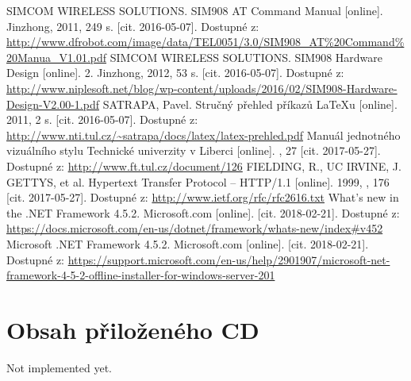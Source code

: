 \documentclass[FM,DP]{tulthesis}  %
\begin{document}
\begin{thebibliography}{10}
SIMCOM WIRELESS SOLUTIONS. SIM908 AT Command Manual [online]. Jinzhong, 2011, 249 s. [cit. 2016-05-07]. Dostupné z: \url{http://www.dfrobot.com/image/data/TEL0051/3.0/SIM908\_AT\%20Command\%20Manua\_V1.01.pdf}
SIMCOM WIRELESS SOLUTIONS. SIM908 Hardware Design [online]. 2. Jinzhong, 2012, 53 s. [cit. 2016-05-07]. Dostupné z: \url{http://www.niplesoft.net/blog/wp-content/uploads/2016/02/SIM908-Hardware-Design-V2.00-1.pdf}
SATRAPA, Pavel. Stručný přehled příkazů LaTeXu [online]. 2011, 2 s. [cit. 2016-05-07]. Dostupné z: \url{http://www.nti.tul.cz/~satrapa/docs/latex/latex-prehled.pdf}
Manuál jednotného vizuálního stylu Technické univerzity v Liberci [online]. , 27 [cit. 2017-05-27]. Dostupné z: \url{http://www.ft.tul.cz/document/126}
FIELDING, R., UC IRVINE, J. GETTYS, et al. Hypertext Transfer Protocol -- HTTP/1.1 [online]. 1999, , 176 [cit. 2017-05-27]. Dostupné z: \url{http://www.ietf.org/rfc/rfc2616.txt}
What's new in the .NET Framework 4.5.2. Microsoft.com [online]. [cit. 2018-02-21]. Dostupné z: \url{https://docs.microsoft.com/en-us/dotnet/framework/whats-new/index#v452}
Microsoft .NET Framework 4.5.2. Microsoft.com [online]. [cit. 2018-02-21]. Dostupné z: \url{https://support.microsoft.com/en-us/help/2901907/microsoft-net-framework-4-5-2-offline-installer-for-windows-server-201}


\end{thebibliography}


\appendix
\chapter{Obsah přiloženého CD}
Not implemented yet.
\end{document}
